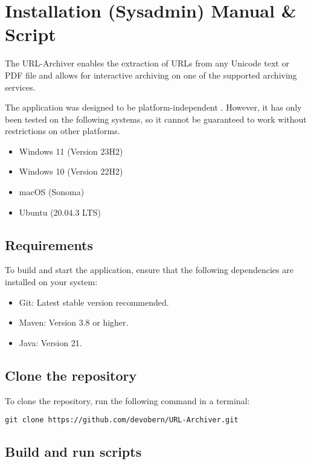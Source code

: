 
\section{Installation (Sysadmin) Manual \& Script} \label{sec::installation_manual}
The URL-Archiver enables the extraction of URLs from any Unicode text or PDF file and allows for interactive archiving
on one of the supported archiving services.
\begin{bfhWarnBox}
The application was designed to be platform-independent . However, it has only been tested on the following systems, so it cannot be guaranteed to work without restrictions on other platforms.
\begin{itemize}
	\item Windows 11 (Version 23H2)
	\item Windows 10 (Version 22H2)
	\item macOS (Sonoma)
	\item Ubuntu (20.04.3 LTS)
\end{itemize}
\end{bfhWarnBox}

\subsection{Requirements}

To build and start the application, ensure that the following dependencies are installed on your system:
\begin{itemize}
	\item Git: Latest stable version recommended.
	\item Maven: Version 3.8 or higher.
	\item Java: Version 21.
\end{itemize}

\subsection{Clone the repository}

To clone the repository, run the following command in a terminal:

\begin{lstlisting}[numbers=none]
git clone https://github.com/devobern/URL-Archiver.git
\end{lstlisting}

\subsection{Build and run scripts}

